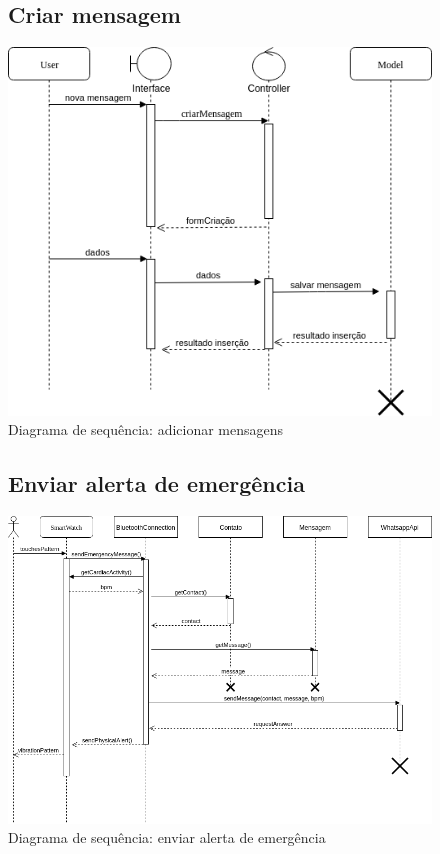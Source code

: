 \documentclass[
	12pt,				%
	openright,			%
	twoside,			%
	a4paper,			%
	english,			%
	french,				%
	spanish,			%
	brazil				%
]{abntex2}
\begin{document}
%
\begin{figure}
	\subsection{Criar mensagem}
	\label{figure_diagrama_sequencia_criar_mensagem}
	\caption{Diagrama de sequência: adicionar mensagens}
	\includegraphics[scale=0.6]{SequenceMensagens/CriarMensagemSequence.png}
	\hfill
\end{figure}
%
\begin{figure}[h]
	\subsection{Enviar alerta de emergência}
	\label{figure_diagrama_sequencia_enviar_alerta_emergencia}
	\caption{ Diagrama de sequência: enviar alerta de emergência }
	\includegraphics[scale=0.6]{SequenceSmartwatch/Send_Alert.png}
	\hfill
\end{figure}
\end{document}
